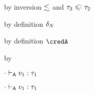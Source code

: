 {\begin{lamportproof*}
    \begin{pfproof}
        \begin{pfproof}
          by inversion $\lesssim$ and $\stype_3 \subteq \stype_2$
        \end{pfproof}
        \begin{pfproof}
          by definition $\delta_{N}$
        \end{pfproof}
        \begin{pfproof}
          by definition $\credA$
        \end{pfproof}
      \qedstep
        \begin{pfproof}
          by 
        \end{pfproof}
    \end{pfproof}

    \begin{pfproof}
      \absurdstep
        \begin{pfproof}
          ${\cdot} \vdash_{\mathsf{A}} v_1 : \tau_1$
        \end{pfproof}
    \end{pfproof}

    \begin{pfproof}
      \absurdstep
        \begin{pfproof}
          ${\cdot} \vdash_{\mathsf{A}} v_1 : \tau_1$
        \end{pfproof}
    \end{pfproof}


\end{lamportproof*}}
